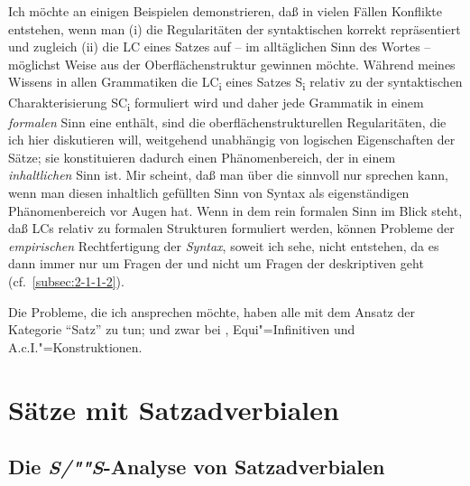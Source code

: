 \documentclass[output=paper]{langsci/langscibook}
\begin{document}
Ich möchte an einigen Beispielen demonstrieren, daß in vielen Fällen Konflikte entstehen, wenn man (i) die Regularitäten der syntaktischen  korrekt repräsentiert und zugleich (ii) die LC eines Satzes auf -- im alltäglichen Sinn des Wortes -- möglichst  Weise aus der Oberflächenstruktur gewinnen möchte. Während meines Wissens in allen Grammatiken die LC\textsubscript{i} eines Satzes S\textsubscript{i} relativ zu der syntaktischen Charakterisierung SC\textsubscript{i} formuliert wird und daher jede Grammatik in einem \textit{formalen} Sinn eine  enthält, sind die oberflächenstrukturellen Regularitäten, die ich hier diskutieren will, weitgehend unabhängig von logischen Eigenschaften der Sätze; sie konstituieren dadurch einen Phänomenbereich, der in einem \textit{inhaltlichen} Sinn  ist. Mir scheint, daß man über die  sinnvoll nur sprechen kann, wenn man diesen inhaltlich gefüllten Sinn von Syntax als eigenständigen Phänomenbereich vor Augen hat. Wenn  in dem rein formalen Sinn im Blick steht, daß LCs relativ zu formalen Strukturen formuliert werden, können Probleme der \textit{empirischen} Rechtfertigung der \textit{Syntax}, soweit ich sehe, nicht entstehen, da es dann immer nur um Fragen der  und nicht um Fragen der deskriptiven  geht (cf.\ \ref{subsec:2-1-1-2}).

Die Probleme, die ich ansprechen möchte, haben alle mit dem Ansatz der Kategorie "`Satz"' zu tun; und zwar bei , Equi"=Infinitiven und A.c.I."=Konstruktionen.

\section{Sätze mit Satzadverbialen}%
\label{sec:2-1}
\subsection{Die \textit{S/""S}-Analyse von Satzadverbialen}%
\label{subsec:2-1-0}
\end{document}
